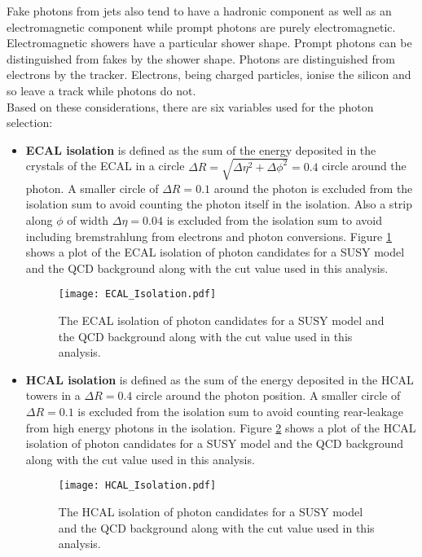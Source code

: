 Fake photons from jets also tend to have a hadronic component as well as an
electromagnetic component while prompt photons are purely electromagnetic.
Electromagnetic showers have a particular shower shape. Prompt photons can be 
distinguished from fakes by the shower shape. Photons are distinguished from 
electrons by the tracker. Electrons, being charged particles, ionise the 
silicon and so leave a track while photons do not. \\ 

Based on these considerations, there are six variables used for the photon 
selection:

\begin{itemize}
\item {\bf ECAL isolation} is defined as the sum of the energy deposited in the
crystals of the ECAL in a circle $\Delta R = \sqrt{\Delta\eta^{2} + 
\Delta\phi^{2}} = 0.4$ circle around the photon. A smaller circle of $\Delta R = 
0.1$ around the photon is excluded from the isolation sum to avoid counting the 
photon itself in the isolation. Also a strip along $\phi$ of width $\Delta \eta 
= 0.04$ is excluded from the isolation sum to avoid including bremstrahlung from 
electrons and photon conversions. Figure \ref{fig:ECAL_Isolation} shows a plot 
of the ECAL isolation of photon candidates for a SUSY model and the QCD 
background along with the cut value used in this analysis.

\begin{figure}
\begin{center}
\texttt{[image: ECAL\_Isolation.pdf]}
\end{center}
\caption{The ECAL isolation of photon candidates for a SUSY model and the QCD 
background along with the cut value used in this analysis.}
\label{fig:ECAL_Isolation}
\end{figure}

\item {\bf HCAL isolation} is defined as the sum of the energy deposited in the 
HCAL towers in a $\Delta R = 0.4$ circle around the photon position. A smaller 
circle of $\Delta R = 0.1$ is excluded from the isolation sum to avoid counting 
rear-leakage from high energy photons in the isolation. Figure 
\ref{fig:HCAL_Isolation} shows a plot of the HCAL isolation of photon candidates 
for a SUSY model and the QCD background along with the cut value used in this 
analysis.

\begin{figure}
\begin{center}
\texttt{[image: HCAL\_Isolation.pdf]}
\end{center}
\caption{The HCAL isolation of photon candidates for a SUSY model and the QCD 
background along with the cut value used in this analysis.}
\label{fig:HCAL_Isolation}
\end{figure}


\end{itemize}
